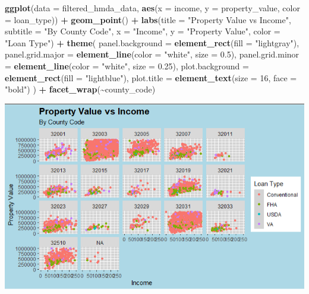 \documentclass[
]{book}
\newenvironment{Shaded}{\begin{snugshade}}{\end{snugshade}}
\newcommand{\AttributeTok}[1]{\textcolor[rgb]{0.13,0.29,0.53}{#1}}
\newcommand{\DecValTok}[1]{\textcolor[rgb]{0.00,0.00,0.81}{#1}}
\newcommand{\FloatTok}[1]{\textcolor[rgb]{0.00,0.00,0.81}{#1}}
\newcommand{\FunctionTok}[1]{\textcolor[rgb]{0.13,0.29,0.53}{\textbf{#1}}}
\newcommand{\NormalTok}[1]{#1}
\newcommand{\SpecialCharTok}[1]{\textcolor[rgb]{0.81,0.36,0.00}{\textbf{#1}}}
\newcommand{\StringTok}[1]{\textcolor[rgb]{0.31,0.60,0.02}{#1}}
\begin{document}
\begin{Shaded}
\begin{Highlighting}[]
\FunctionTok{ggplot}\NormalTok{(}\AttributeTok{data =}\NormalTok{ filtered\_hmda\_data, }\FunctionTok{aes}\NormalTok{(}\AttributeTok{x =}\NormalTok{ income, }\AttributeTok{y =}\NormalTok{ property\_value, }\AttributeTok{color =}\NormalTok{ loan\_type)) }\SpecialCharTok{+}
  \FunctionTok{geom\_point}\NormalTok{() }\SpecialCharTok{+}
  \FunctionTok{labs}\NormalTok{(}\AttributeTok{title =} \StringTok{"Property Value vs Income"}\NormalTok{,}
       \AttributeTok{subtitle =} \StringTok{"By County Code"}\NormalTok{,}
       \AttributeTok{x =} \StringTok{"Income"}\NormalTok{,}
       \AttributeTok{y =} \StringTok{"Property Value"}\NormalTok{,}
       \AttributeTok{color =} \StringTok{"Loan Type"}\NormalTok{) }\SpecialCharTok{+}
  \FunctionTok{theme}\NormalTok{(}
    \AttributeTok{panel.background =} \FunctionTok{element\_rect}\NormalTok{(}\AttributeTok{fill =} \StringTok{"lightgray"}\NormalTok{),}
    \AttributeTok{panel.grid.major =} \FunctionTok{element\_line}\NormalTok{(}\AttributeTok{color =} \StringTok{"white"}\NormalTok{, }\AttributeTok{size =} \FloatTok{0.5}\NormalTok{),}
    \AttributeTok{panel.grid.minor =} \FunctionTok{element\_line}\NormalTok{(}\AttributeTok{color =} \StringTok{"white"}\NormalTok{, }\AttributeTok{size =} \FloatTok{0.25}\NormalTok{),}
    \AttributeTok{plot.background =} \FunctionTok{element\_rect}\NormalTok{(}\AttributeTok{fill =} \StringTok{"lightblue"}\NormalTok{),}
    \AttributeTok{plot.title =} \FunctionTok{element\_text}\NormalTok{(}\AttributeTok{size =} \DecValTok{16}\NormalTok{, }\AttributeTok{face =} \StringTok{"bold"}\NormalTok{)}
\NormalTok{  ) }\SpecialCharTok{+}
  \FunctionTok{facet\_wrap}\NormalTok{(}\SpecialCharTok{\textasciitilde{}}\NormalTok{county\_code)}
\end{Highlighting}
\end{Shaded}

\includegraphics{images/custom_theme_2.PNG}
\end{document}
